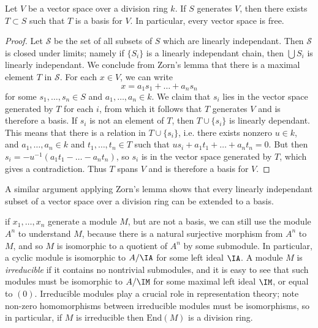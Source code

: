 \begin{lemma}
    Let $V$ be a vector space over a division ring $k$. If $S$ generates $V$, then there exists $T \subset S$ such that $T$ is a basis for $V$. In particular, every vector space is free.
\end{lemma}
\begin{proof}
    Let $\mathcal{S}$ be the set of all subsets of $S$ which are linearly independant. Then $\mathcal{S}$ is closed under limits; namely if $\{ S_i \}$ is a linearly independant chain, then $\bigcup S_i$ is linearly independant. We conclude from Zorn's lemma that there is a maximal element $T$ in $\mathcal{S}$. For each $x \in V$, we can write
    \[ x = a_1 s_1 + \dots + a_n s_n \]
    for some $s_1, \dots, s_n \in S$ and $a_1, \dots, a_n \in k$. We claim that $s_i$ lies in the vector space generated by $T$ for each $i$, from which it follows that $T$ generates $V$ and is therefore a basis. If $s_i$ is not an element of $T$, then $T \cup \{ s_i \}$ is linearly dependant. This means that there is a relation in $T \cup \{ s_i \}$, i.e. there exists nonzero $u \in k$, and $a_1, \dots, a_n \in k$ and $t_1, \dots, t_n \in T$ such that $us_i + a_1t_1 + \dots + a_nt_n = 0$. But then $s_i = -u^{-1} (a_1t_1 - \dots - a_nt_n)$, so $s_i$ is in the vector space generated by $T$, which gives a contradiction. Thus $T$ spans $V$ and is therefore a basis for $V$.
\end{proof}

\begin{remark}
    A similar argument applying Zorn's lemma shows that every linearly independant subset of a vector space over a division ring can be extended to a basis.
\end{remark}

if $x_1, \dots, x_n$ generate a module $M$, but are not a basis, we can still use the module $A^n$ to understand $M$, because there is a natural surjective morphism from $A^n$ to $M$, and so $M$ is isomorphic to a quotient of $A^n$ by some submodule. In particular, a cyclic module is isomorphic to $A/\IA$ for some left ideal $\IA$. A module $M$ is \emph{irreducible} if it contains no nontrivial submodules, and it is easy to see that such modules must be isomorphic to $A/\IM$ for some maximal left ideal $\IM$, or equal to $(0)$. Irreducible modules play a crucial role in representation theory; note non-zero homomorphisms between irreducible modules must be isomorphisms, so in particular, if $M$ is irreducible then $\text{End}(M)$ is a division ring.

